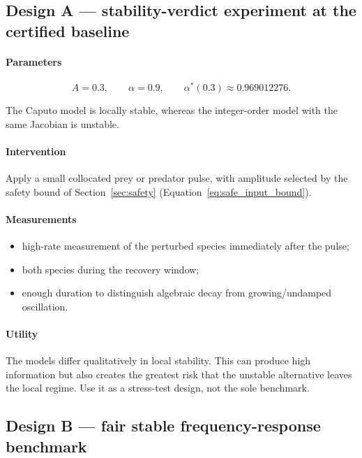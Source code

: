 \subsection{Design A --- stability-verdict experiment at the certified baseline}

\paragraph{Parameters}

\[
A=0.3,
\qquad \alpha=0.9,
\qquad \alpha^*(0.3)\approx0.969012276.
\]

The Caputo model is locally stable, whereas the integer-order model with the same Jacobian is unstable.

\paragraph{Intervention}

Apply a small collocated prey or predator pulse, with amplitude selected by the safety bound of Section~\ref{sec:safety} (Equation~\eqref{eq:safe_input_bound}).

\paragraph{Measurements}

\begin{itemize}
\item high-rate measurement of the perturbed species immediately after the pulse;
\item both species during the recovery window;
\item enough duration to distinguish algebraic decay from growing/undamped oscillation.
\end{itemize}

\paragraph{Utility}

The models differ qualitatively in local stability. This can produce high information but also creates the greatest risk that the unstable alternative leaves the local regime. Use it as a stress-test design, not the sole benchmark.

\subsection{Design B --- fair stable frequency-response benchmark}

